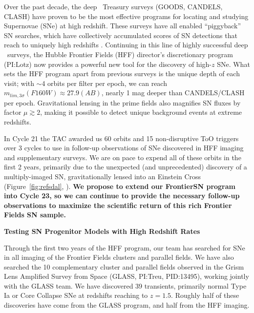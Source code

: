 \documentclass[12pt]{article}
\begin{document}
%
%
\justification          %

Over the past decade, the deep \HST\ Treasury surveys (GOODS, CANDELS,
CLASH) have proven to be the most effective programs for locating and
studying Supernovae (SNe) at high redshift.  These surveys have all
enabled ``piggyback'' SN searches,
which have collectively accumulated scores of SN detections that reach
to uniquely high redshifts
\citep{Riess:2007,Dahlen:2008,Graur:2014,Rodney:2014}.  Continuing in
this line of highly successful deep \HST\ surveys, the Hubble Frontier
Fields (HFF) director's discretionary program (PI:Lotz) now provides a
powerful new tool for the discovery of high-$z$ SNe.  What sets the
HFF program apart from previous surveys is the unique depth
of each visit; with $\sim$4 orbits per filter per epoch, we can reach
$m_{lim,3\sigma}(F160W)\approx27.9 (AB)$, nearly 1 mag deeper than
CANDELS/CLASH per epoch. Gravitational lensing in the prime fields
also magnifies SN fluxes by factor $\mu\gtrsim2$, making it possible
to detect unique background events at extreme redshifts. 

In Cycle 21 the TAC awarded us 60 orbits and 15 non-disruptive ToO
triggers over 3 cycles to use in follow-up observations of SNe
discovered in HFF imaging and supplementary surveys. We are on pace to
expend all of these orbits in the first 2 years, primarily due to the
unexpected (and unprecedented) discovery of a multiply-imaged SN,
gravitationally lensed into an Einstein Cross
(Figure~\ref{fig:refsdal}, \citealt{Kelly:2015}).  {\bf We propose to
  extend our FrontierSN program into Cycle 23, so we can continue to
  provide the necessary follow-up observations to maximize the
  scientific return of this rich Frontier Fields SN sample.}

\bigskip
\centerline {\bf Testing SN Progenitor Models with High Redshift Rates} 
\medskip

Through the first two years of the HFF program, our team has searched
for SNe in all imaging of the Frontier Fields clusters and parallel
fields.  We have also searched the 10 complementary cluster and
parallel fields observed in the Grism Lens Amplified Survey from Space
(GLASS, PI:Treu, PID:13495), working jointly with the GLASS team.  We
have discovered 39 transients, primarily normal Type Ia or Core
Collapse SNe at redshifts reaching to $z=1.5$.  Roughly half of these
discoveries have come from the GLASS program, and half from the HFF
imaging.
\end{document}
